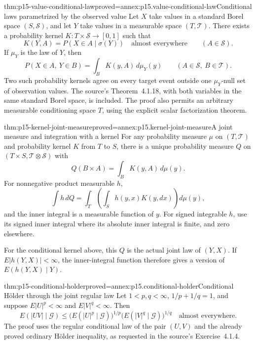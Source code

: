 \begin{hbtheorem}{thm:p15-value-conditional-law}{proved=annex:p15.value-conditional-law}{Conditional laws parametrized by the observed value}
Let \(X\) take values in a standard Borel space \((S,\mathcal S)\),
and let \(Y\) take values in a measurable space \((T,\mathcal T)\).
There exists a probability kernel \(K:T\times\mathcal S\to[0,1]\)
such that
\[
                  K(Y,A)=P(X\in A\mid\sigma(Y))
                               \quad\text{almost everywhere}
                                       \qquad(A\in\mathcal S).
\]
If \(\mu_Y\) is the law of \(Y\), then
\[
               P(X\in A,\ Y\in B)=\int_B K(y,A)\,d\mu_Y(y)
                                  \qquad(A\in\mathcal S,\ B\in\mathcal T).
\]
Two such probability kernels agree on every target event outside one
\(\mu_Y\)-null set of observation values.
The source's Theorem~4.1.18, with both variables in the same standard
Borel space, is included. The proof also permits an arbitrary measurable
conditioning space \(T\), using the explicit scalar factorization theorem.
\end{hbtheorem}

\begin{hbtheorem}{thm:p15-kernel-joint-measure}{proved=annex:p15.kernel-joint-measure}{A joint measure and integration with a kernel}
For any probability measure \(\mu\) on \((T,\mathcal T)\) and
probability kernel \(K\) from \(T\) to \(S\), there is a unique
probability measure \(Q\) on
\((T\times S,\mathcal T\otimes\mathcal S)\) with
\[
                              Q(B\times A)=\int_BK(y,A)\,d\mu(y).
\]
For nonnegative product measurable \(h\),
\[
                \int h\,dQ
                      =\int_T\left(\int_Sh(y,x)K(y,dx)\right)d\mu(y),
\]
and the inner integral is a measurable function of \(y\).
For signed integrable \(h\), use its signed inner integral where its
absolute inner integral is finite, and zero elsewhere.

For the conditional kernel above, this \(Q\) is the actual joint law
of \((Y,X)\). If \(E|h(Y,X)|<\infty\), the inner-integral function
therefore gives a version of \(E(h(Y,X)\mid Y)\).
\end{hbtheorem}

\begin{hbtheorem}{thm:p15-conditional-holder}{proved=annex:p15.conditional-holder}{Conditional H\"older through the joint regular law}
Let \(1<p,q<\infty\), \(1/p+1/q=1\), and suppose
\(E|U|^p<\infty\) and \(E|V|^q<\infty\).
Then
\[
 E(|UV|\mid\mathcal G)
    \leq \bigl(E(|U|^p\mid\mathcal G)\bigr)^{1/p}
          \bigl(E(|V|^q\mid\mathcal G)\bigr)^{1/q}
                      \quad\text{almost everywhere}.
\]
The proof uses the regular conditional law of the pair \((U,V)\)
and the already proved ordinary H\"older inequality, as requested in
the source's Exercise~4.1.4.
\end{hbtheorem}

